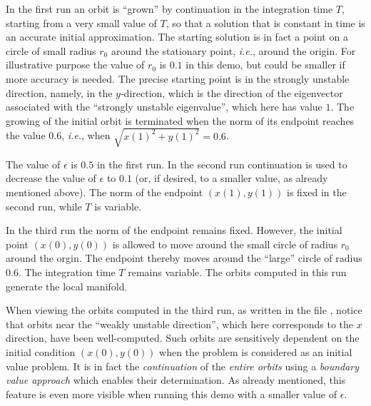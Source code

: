 \documentclass[12pt]{report}
\def\eps{\epsilon}
\begin{document}
In the first run an orbit is ``grown'' by continuation in the integration time 
$T$, starting from a very small value of $T$, so that a solution that is
constant in time is an accurate initial approximation. The starting solution is 
in fact a point on a circle of small radius $r_0$ around the stationary point,
{\it i.e.}, around the origin. For illustrative purpose the value of $r_0$ is
$0.1$ in this demo, but could be smaller if more accuracy is needed.
The precise starting point is in the strongly unstable direction, namely, in 
the $y$-direction, which is the direction of the eigenvector associated with 
the ``strongly unstable eigenvalue'', which here has value $1$. 
The growing of the initial orbit is terminated when the norm of its endpoint 
reaches the value 0.6, {\it i.e.}, when $\sqrt{x(1)^2+y(1)^2}=0.6$. 

The value of $\eps$ is $0.5$ in the first run. In the second run continuation
is used to decrease the value of $\eps$ to $0.1$ (or, if desired, to a smaller 
value, as already mentioned above). The norm of the endpoint  $(x(1),y(1))$
is fixed in the second run, while $T$ is variable.

In the third run the norm of the endpoint remains fixed. However, the 
initial point $(x(0),y(0))$ is allowed to move around the small circle of 
radius $r_0$ around the orgin.  The endpoint thereby moves around the ``large''
circle of radius $0.6$. The integration time $T$ remains variable.
The orbits computed in this run generate the local 
manifold.

When viewing the orbits computed in the third run, as written in the file 
, notice that orbits near the ``weakly unstable direction'',
which here corresponds to the $x$ direction, have been well-computed. Such 
orbits are sensitively dependent on the initial condition $(x(0),y(0))$ when 
the problem is considered as an initial value problem. It is in fact the 
{\it continuation} of the {\it entire orbits} using a {\it boundary value 
approach} which enables their determination. As already mentioned, this 
feature is even more visible when running this demo with a smaller value 
of $\eps$.
\newpage

\end{document}
